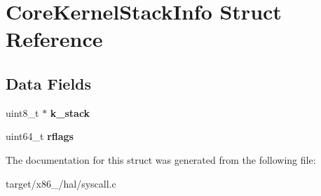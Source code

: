 \hypertarget{structCoreKernelStackInfo}{}\section{Core\+Kernel\+Stack\+Info Struct Reference}
\label{structCoreKernelStackInfo}
\subsection*{Data Fields}
\begin{DoxyCompactItemize}
\item 
uint8\+\_\+t $\ast$ {\bfseries k\+\_\+stack}\hypertarget{structCoreKernelStackInfo_acee130d4678a4225462045c9aaba77de}{}\label{structCoreKernelStackInfo_acee130d4678a4225462045c9aaba77de}

\item 
uint64\+\_\+t {\bfseries rflags}\hypertarget{structCoreKernelStackInfo_a31e60cf2467d080253a65045dc555b5a}{}\label{structCoreKernelStackInfo_a31e60cf2467d080253a65045dc555b5a}

\end{DoxyCompactItemize}


The documentation for this struct was generated from the following file\+:\begin{DoxyCompactItemize}
\item 
target/x86\+\_/hal/syscall.\+c\end{DoxyCompactItemize}

